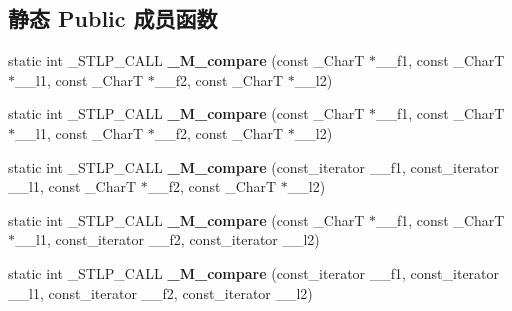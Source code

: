 \subsection*{静态 Public 成员函数}
\begin{DoxyCompactItemize}
\item 
\mbox{\label{classbasic__string_a14253da3b887be21e166bf598b1dd954}} 
static int \+\_\+\+S\+T\+L\+P\+\_\+\+C\+A\+LL {\bfseries \+\_\+\+M\+\_\+compare} (const \+\_\+\+CharT $\ast$\+\_\+\+\_\+f1, const \+\_\+\+CharT $\ast$\+\_\+\+\_\+l1, const \+\_\+\+CharT $\ast$\+\_\+\+\_\+f2, const \+\_\+\+CharT $\ast$\+\_\+\+\_\+l2)
\item 
\mbox{\label{classbasic__string_a14253da3b887be21e166bf598b1dd954}} 
static int \+\_\+\+S\+T\+L\+P\+\_\+\+C\+A\+LL {\bfseries \+\_\+\+M\+\_\+compare} (const \+\_\+\+CharT $\ast$\+\_\+\+\_\+f1, const \+\_\+\+CharT $\ast$\+\_\+\+\_\+l1, const \+\_\+\+CharT $\ast$\+\_\+\+\_\+f2, const \+\_\+\+CharT $\ast$\+\_\+\+\_\+l2)
\item 
\mbox{\label{classbasic__string_a1653e08e5fec7a318c6e1b645ad77bed}} 
static int \+\_\+\+S\+T\+L\+P\+\_\+\+C\+A\+LL {\bfseries \+\_\+\+M\+\_\+compare} (const\+\_\+iterator \+\_\+\+\_\+f1, const\+\_\+iterator \+\_\+\+\_\+l1, const \+\_\+\+CharT $\ast$\+\_\+\+\_\+f2, const \+\_\+\+CharT $\ast$\+\_\+\+\_\+l2)
\item 
\mbox{\label{classbasic__string_a252aa4faa5f5b5753158ff95208af1ec}} 
static int \+\_\+\+S\+T\+L\+P\+\_\+\+C\+A\+LL {\bfseries \+\_\+\+M\+\_\+compare} (const \+\_\+\+CharT $\ast$\+\_\+\+\_\+f1, const \+\_\+\+CharT $\ast$\+\_\+\+\_\+l1, const\+\_\+iterator \+\_\+\+\_\+f2, const\+\_\+iterator \+\_\+\+\_\+l2)
\item 
\mbox{\label{classbasic__string_a1328b4c09357ad8bbfff1a756d31a131}} 
static int \+\_\+\+S\+T\+L\+P\+\_\+\+C\+A\+LL {\bfseries \+\_\+\+M\+\_\+compare} (const\+\_\+iterator \+\_\+\+\_\+f1, const\+\_\+iterator \+\_\+\+\_\+l1, const\+\_\+iterator \+\_\+\+\_\+f2, const\+\_\+iterator \+\_\+\+\_\+l2)
\end{DoxyCompactItemize}

